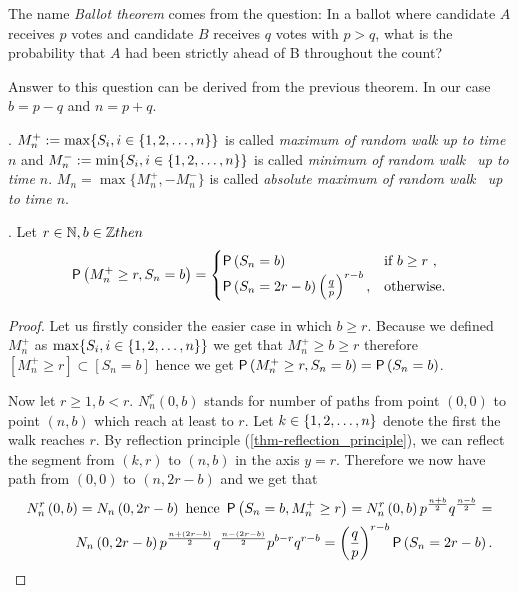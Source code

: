  \begin{rem}
   The name \textit{Ballot theorem} comes from the question: In a ballot where candidate $A$ receives $p$ votes and candidate $B$ receives $q$ votes with $p > q$, what is the probability that $A$ had been strictly ahead of B throughout the count?

   Answer to this question can be derived from the previous theorem. In our case $b=p-q$ and $n=p+q.$
 \end{rem}
\begin{defn}\label{defn-max}
  \Lrw. $M_n^+:= \max \{S_i, i\in \{1,2,\ldots, n\}\}$ is called \emph{maximum of random walk \rw} \emph{up to time $n$} and $M_n^-:= \min \{S_i, i\in \{1,2,\ldots, n\}\}$ is called \emph{minimum of random walk \rw\ up to time $n.$} $M_n=\max\{M_n^+, -M_n^-\}$ is called \emph{absolute maximum of random walk \rw\ up to time $n.$}
\end{defn}
\begin{thm}\label{thm-probability_maximum_upto_time}
 \Lrw. Let $r \in \mathbb{N}, b \in \mathbb{Z} then$
 \[
 \operatorname{\mathsf{P}} \left(  M_n^+\geq r, S_n=b \right) =
 \begin{cases}
 \operatorname{\mathsf{P}} \left( S_n=b \right) & \text{if $b \geq r$ },\\
 \operatorname{\mathsf{P}} \left( S_n=2r-b \right) \left( \frac{q}{p} \right) ^{r-b}, & \text{otherwise}.
 \end{cases}
 \]
\end{thm}
\begin{proof}
 Let us firstly consider the easier case in which $b \geq r$. Because we defined $ M_n^+$ as $\max \{S_i, i\in \{1,2,\ldots, n\} \}$ we get that $ M_n^+ \geq b \geq r$
 therefore $[ M_n^+ \geq r] \subset [S_n=b]$ hence we get $\operatorname{\mathsf{P}} \left(  M_n^+\geq r, S_n=b \right) =
 \operatorname{\mathsf{P}} \left( S_n=b \right)$.

 Now let $r\geq 1, b<r$. $N_n^r \left( 0,b \right) $ stands for number of paths from point $ \left( 0,0 \right) $ to point $ \left( n,b \right) $ which reach at least to $r$.
 Let $k \in \{1,2,\ldots, n\}$ denote the first \Time the walk reaches $r$. By reflection principle (\ref{thm-reflection_principle}), we can reflect the segment from $\left(k,r\right)$ to $ \left( n,b \right) $ in the axis $y=r$.
 Therefore we now have path from $ \left( 0,0 \right) $ to $ \left( n,2r-b \right) $
 and we get that
 \[
 \begin{split}
  N_n^r \left( 0,b \right) =N_n \left( 0,2r-b \right) \text{ hence } \operatorname{\mathsf{P}} \left( S_n=b, M_n^+\geq r \right)
 =N_n^r \left( 0,b \right) p^{\frac{n+b}{2}}q^{\frac{n-b}{2}}=\\
 N_n \left( 0,2r-b \right) p^{\frac{n+ \left( 2r-b \right) }{2}}q^{\frac{n- \left( 2r-b \right) }{2}}p^{b-r}q^{r-b}= \left( \frac{q}{p} \right) ^{r-b}\operatorname{\mathsf{P}} \left( S_n=2r-b \right).
\end{split}
 \]
\end{proof}

